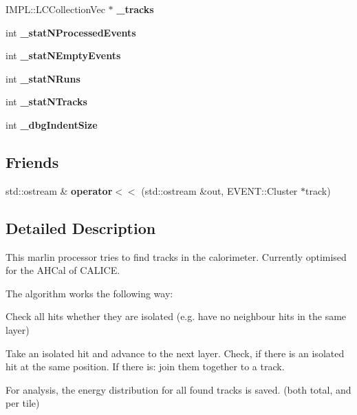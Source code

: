 \begin{DoxyCompactItemize}
\item 
I\-M\-P\-L\-::\-L\-C\-Collection\-Vec $\ast$ {\bfseries \-\_\-tracks}\label{classHCalTrackingNNProcessor_af134797b8e36d66d70c760f313d9eed5}

\item 
int {\bfseries \-\_\-stat\-N\-Processed\-Events}\label{classHCalTrackingNNProcessor_aae2cd6cbe12f845cb18666096a4e01ef}

\item 
int {\bfseries \-\_\-stat\-N\-Empty\-Events}\label{classHCalTrackingNNProcessor_a13150263f7ac321c0198379aaae28ad7}

\item 
int {\bfseries \-\_\-stat\-N\-Runs}\label{classHCalTrackingNNProcessor_aaa8fa58d0503315e8e1a8b47bdc86da8}

\item 
int {\bfseries \-\_\-stat\-N\-Tracks}\label{classHCalTrackingNNProcessor_ae5f4d0e1feb52d0e5e6e70151f4b9b11}

\item 
int {\bfseries \-\_\-dbg\-Indent\-Size}\label{classHCalTrackingNNProcessor_aec5a1f7fbd3f4f14fd42e66ec58390cc}

\end{DoxyCompactItemize}
\subsection*{Friends}
\begin{DoxyCompactItemize}
\item 
std\-::ostream \& {\bfseries operator$<$$<$} (std\-::ostream \&out, E\-V\-E\-N\-T\-::\-Cluster $\ast$track)\label{classHCalTrackingNNProcessor_ac878b174fea2efa52f499df6135324b9}

\end{DoxyCompactItemize}


\subsection{Detailed Description}
This marlin processor tries to find tracks in the calorimeter. Currently optimised for the A\-H\-Cal of C\-A\-L\-I\-C\-E.

The algorithm works the following way\-:
\begin{DoxyEnumerate}
\item Check all hits whether they are isolated (e.\-g. have no neighbour hits in the same layer)
\item Take an isolated hit and advance to the next layer. Check, if there is an isolated hit at the same position. If there is\-: join them together to a track.
\item For analysis, the energy distribution for all found tracks is saved. (both total, and per tile) 
\end{DoxyEnumerate}

